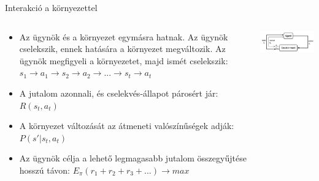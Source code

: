 \documentclass[english, aspectratio=169]{beamer}
\begin{document}
\begin{frame}{Interakció a környezettel}
\begin{columns}
\begin{column}{.5\textwidth}
\begin{itemize}
	\item Az ügynök és a környezet egymásra hatnak. Az ügynök cselekszik, ennek hatására a környezet megváltozik. Az ügynök megfigyeli a környezetet, majd ismét cselekszik:
$s_1 \rightarrow a_1 \rightarrow s_2 \rightarrow a_2 \rightarrow ... \rightarrow s_t \rightarrow a_t$
	\item A jutalom azonnali, és cselekvés-állapot párosért jár: $R(s_{t}, a_{t})$
	\item A környezet változását az átmeneti valószínűségek adják: $P(s'|s_{t}, a_{t})$
	\item Az ügynök célja a lehető legmagasabb jutalom összegyűjtése hosszú távon: $E_{\pi}(r_{1}+r_{2}+r_{3}+...)\rightarrow{max}$
\end{itemize}
\end{column}
\begin{column}{.5\textwidth}
\begin{center}
\includegraphics[width=7.5cm, keepaspectratio]{images/reinf_4.png}
\end{center}
\end{column}
\end{columns}
\end{frame}
\end{document}
